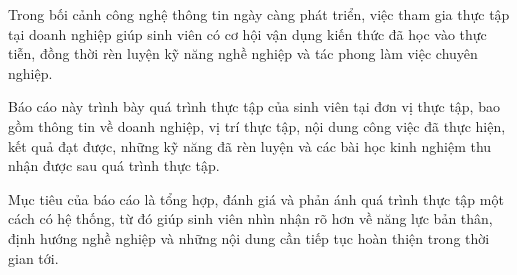 
Trong bối cảnh công nghệ thông tin ngày càng phát triển, việc tham gia thực tập tại doanh nghiệp giúp sinh viên có cơ hội vận dụng kiến thức đã học vào thực tiễn, đồng thời rèn luyện kỹ năng nghề nghiệp và tác phong làm việc chuyên nghiệp.

Báo cáo này trình bày quá trình thực tập của sinh viên tại đơn vị thực tập, bao gồm thông tin về doanh nghiệp, vị trí thực tập, nội dung công việc đã thực hiện, kết quả đạt được, những kỹ năng đã rèn luyện và các bài học kinh nghiệm thu nhận được sau quá trình thực tập.

Mục tiêu của báo cáo là tổng hợp, đánh giá và phản ánh quá trình thực tập một cách có hệ thống, từ đó giúp sinh viên nhìn nhận rõ hơn về năng lực bản thân, định hướng nghề nghiệp và những nội dung cần tiếp tục hoàn thiện trong thời gian tới.
